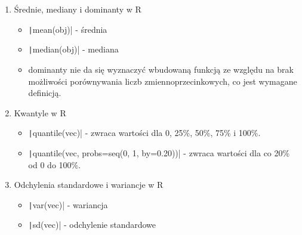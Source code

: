 \documentclass[11pt]{article}
\begin{document}
\begin{enumerate}
        \item Średnie, mediany i dominanty w R
        \begin{itemize}
        	\item \texttt|mean(obj)| - średnia
        	\item \texttt|median(obj)| - mediana
        	\item dominanty nie da się wyznaczyć wbudowaną funkcją ze względu na
        	brak możliwości porównywania liczb zmiennoprzecinkowych, co jest 
        	wymagane definicją.
        \end{itemize}
        
        \item Kwantyle w R
        \begin{itemize}
        	\item \texttt|quantile(vec)| - zwraca wartości dla 0, 25\%, 50\%,
        	75\% i 100\%.
        	\item \texttt|quantile(vec, probs=seq(0, 1, by=0.20))| - zwraca wartości dla co 20\% od 0 do 100\%.
        \end{itemize}
        
        \item Odchylenia standardowe i wariancje w R
        \begin{itemize}
        	\item \texttt|var(vec)| - wariancja
        	\item \texttt|sd(vec)| - odchylenie standardowe
        \end{itemize}
        

\end{enumerate}
\end{document}
